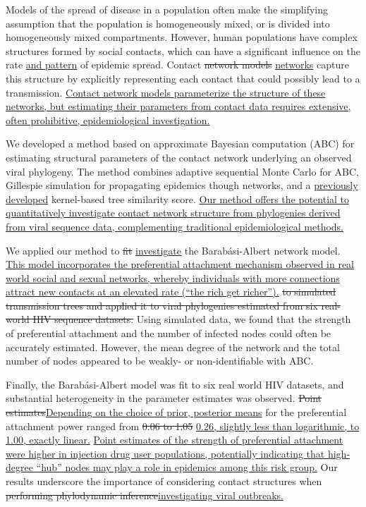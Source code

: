 Models of the spread of disease in a population often make the simplifying
assumption that the population is homogeneously mixed, or is divided into
homogeneously mixed compartments. However, human populations have complex
structures formed by social contacts, which can have a significant influence on
the rate {\color{blue}\uline{and pattern}} of epidemic spread. Contact
{\color{red}\sout{network models}} {\color{blue}\uline{networks}} capture this
structure by explicitly representing each contact that could possibly lead to a
transmission. {\color{blue}\uline{Contact network models parameterize the
structure of these networks, but estimating their parameters from contact data
requires extensive, often prohibitive, epidemiological investigation. }}

We developed a method based on approximate Bayesian computation (ABC) for
estimating structural parameters of the contact network underlying an
observed viral phylogeny. The method combines adaptive sequential Monte Carlo
for ABC, Gillespie simulation for propagating epidemics though networks, and a
{\color{blue}\uline{previously developed}} kernel-based tree similarity score.
{\color{blue}\uline{Our method offers the potential to quantitatively
investigate contact network structure from phylogenies derived from viral
sequence data, complementing traditional epidemiological methods.}}

We applied our method to {\color{red}\sout{fit}}
{\color{blue}\uline{investigate}} the Barab\'{a}si-Albert network model.
{\color{blue}\uline{This model incorporates the preferential attachment
mechanism observed in real world social and sexual networks, whereby
individuals with more connections attract new contacts at an elevated rate
(``the rich get richer'').}}
{\color{red}\sout{to simulated transmission trees and applied it to viral
phylogenies estimated from six real-world HIV sequence datasets.}} Using
simulated data, we found that the strength of preferential attachment and the
number of infected nodes could often be accurately estimated. However, the mean
degree of the network and the total number of nodes appeared to be weakly- or
non-identifiable with ABC. 

Finally, the Barab\'{a}si-Albert model was fit to six real world HIV datasets,
and substantial heterogeneity in the parameter estimates was observed.
{\color{red}\sout{Point estimates}}{\color{blue}\uline{Depending on the choice
of prior, posterior means}} for the preferential attachment power ranged from
{\color{red}\sout{0.06 to 1.05}} {\color{blue}\uline{0.26, slightly less than
logarithmic, to 1.00, exactly linear.}} {\color{blue}\uline{Point estimates of
the strength of preferential attachment were higher in injection drug user
populations, potentially indicating that high-degree ``hub'' nodes may play a
role in epidemics among this risk group.}} Our results underscore the
importance of considering contact structures when {\color{red}\sout{performing
phylodynamic inference}}{\color{blue}\uline{investigating viral outbreaks.}}
